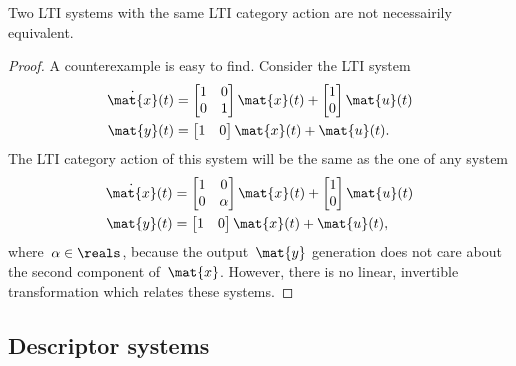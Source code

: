 \begin{lemma}
    Two LTI systems with the same LTI category action are not necessairily equivalent.
\end{lemma}
\begin{proof}
    A counterexample is easy to find.
    Consider the LTI system
    \begin{equation*}
        \begin{aligned}
            \dot{\mat{x}}(t) & =\begin{bmatrix} 1&0\\ 0&1 \end{bmatrix} \mat{x}(t)+\begin{bmatrix} 1\\ 0\end{bmatrix} \mat{u}(t) \\
            \mat{y}(t)       & =\begin{bmatrix} 1&0\end{bmatrix} \mat{x}(t)+\mat{u}(t).
        \end{aligned}
    \end{equation*}
    The LTI category action of this system will be the same as the one of any system
    \begin{equation*}
        \begin{aligned}
            \dot{\mat{x}}(t) & =\begin{bmatrix} 1&0\\ 0&\alpha \end{bmatrix} \mat{x}(t)+\begin{bmatrix} 1\\ 0\end{bmatrix} \mat{u}(t) \\
            \mat{y}(t)       & =\begin{bmatrix} 1&0\end{bmatrix} \mat{x}(t)+\mat{u}(t),
        \end{aligned}
    \end{equation*}
    where~$\alpha \in \reals$, because the output~$\mat{y}$ generation does not care about the second component of~$\mat{x}$.
    However, there is no linear, invertible transformation which relates these systems.
\end{proof}

\subsection{Descriptor systems}

